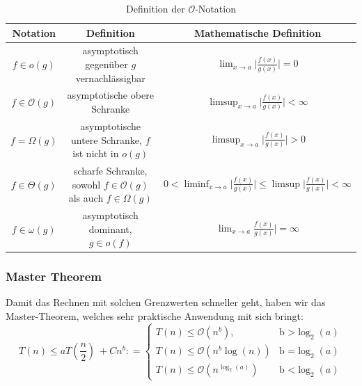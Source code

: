 \documentclass[a4paper]{article}
\begin{document}
    \begin{table}[h]
        \centering
        \small
        \begin{tabular}{c|c|c}
            Notation & Definition & Mathematische Definition \\
            \hline
            $f \in o(g)$ 
            & asymptotisch gegenüber $g$ vernachlässigbar 
            & $\lim_{x\to a} \big| \frac{f(x)}{g(x)} \big| = 0 $\\
            
             $f \in \mathcal{O}(g)$
             & asymptotische obere Schranke  
             & $\limsup_{x\to a} \big| \frac{f(x)}{g(x)} \big| < \infty $ \\
             
            $f = \Omega(g)$ 
            & asymptotische untere Schranke, $f$ ist nicht in $o(g)$ 
            & 
            $\limsup_{x\to a} \big| \frac{f(x)}{g(x)} \big| > 0 $\\

            $f \in \Theta(g)$            
            & scharfe Schranke,  sowohl $f \in \mathcal{O}(g)$ als auch $f \in \Omega(g)$
            &  $0 < \liminf_{x\to a} \big| \frac{f(x)}{g(x)} \big| \leq \limsup \big| \frac{f(x)}{g(x)} \big| < \infty $ \\

            $f \in \omega(g)$
            &  asymptotisch dominant, $g \in o(f)$
            & $\lim_{x \to a}\frac{f(x)}{g(x)} \big| = \infty$ \\
        \hline
        \end{tabular}
        \caption{Definition der $\mathcal{O}$-Notation}
        \label{tab:ONotation}
    \end{table}
    
    \subsubsection{Master Theorem}
    Damit das Rechnen mit solchen Grenzwerten schneller geht, haben wir das Master-Theorem, welches sehr praktische Anwendung mit sich bringt:
      \begin{equation} \label{MasterTheorem}
  T(n) \leq aT(\frac{n}{2})\ + Cn^b: =\begin{cases}      T(n) \leq \mathcal{O}(n^b), & \text{b >} \log_2(a)\\
      T(n) \leq \mathcal{O}(n^b\log(n)) &\text{b =} \log_2(a)\\
      T(n) \leq \mathcal{O}(n^{\log_2(a)}) & \text{b <} \log_2(a)
    \end{cases}         
  \end{equation}
\end{document}

